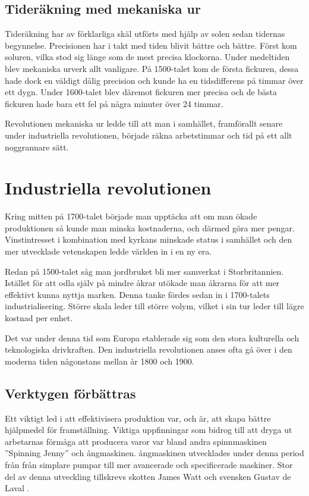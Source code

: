 \documentclass[a4paper,12pt,fleqn]{article}
\begin{document}
\subsection{Tideräkning med mekaniska ur}

Tideräkning har av förklarliga skäl utförts med hjälp av solen sedan tidernas begynnelse. Precisionen har i takt med tiden blivit bättre och bättre. Först kom soluren, vilka stod sig länge som de mest precisa klockorna. Under medeltiden blev mekaniska urverk allt vanligare. På 1500-talet kom de första fickuren, dessa hade dock en väldigt dålig precision och kunde ha en tidsdifferens på timmar över ett dygn. Under 1600-talet blev däremot fickuren mer precisa och de bästa fickuren hade bara ett fel på några minuter över 24 timmar. 

Revolutionen mekaniska ur ledde till att man i samhället, framförallt senare under industriella revolutionen, började räkna arbetstimmar och tid på ett allt noggrannare sätt. 

\newpage
\section{Industriella revolutionen}

Kring mitten på 1700-talet började man upptäcka att om man ökade produktionen så kunde man minska kostnaderna, och därmed göra mer pengar. Vinstintresset i kombination med kyrkans minskade status i samhället och den mer utvecklade vetenskapen ledde världen in i en ny era. 

Redan på 1500-talet såg man jordbruket bli mer samverkat i Storbritannien. Istället för att odla själv på mindre åkrar utökade man åkrarna för att mer effektivt kunna nyttja marken. Denna tanke fördes sedan in i 1700-talets industrialisering. Större skala leder till större volym, vilket i sin tur leder till lägre kostnad per enhet. 

Det var under denna tid som Europa etablerade sig som den stora kulturella och teknologiska drivkraften. Den industriella revolutionen anses ofta gå över i den moderna tiden någonstans mellan år 1800 och 1900. 

\subsection{Verktygen förbättras}

Ett viktigt led i att effektivisera produktion var, och är, att skapa bättre hjälpmedel för framställning. Viktiga uppfinningar som bidrog till att dryga ut arbetarnas förmåga att producera varor var bland andra spinnmaskinen ''Spinning Jenny'' och ångmaskinen. ångmaskinen utvecklades under denna period från från simplare pumpar till mer avancerade och specificerade maskiner. Stor del av denna utveckling tillskrevs skotten James Watt och svensken Gustav de Laval . 
\end{document}
